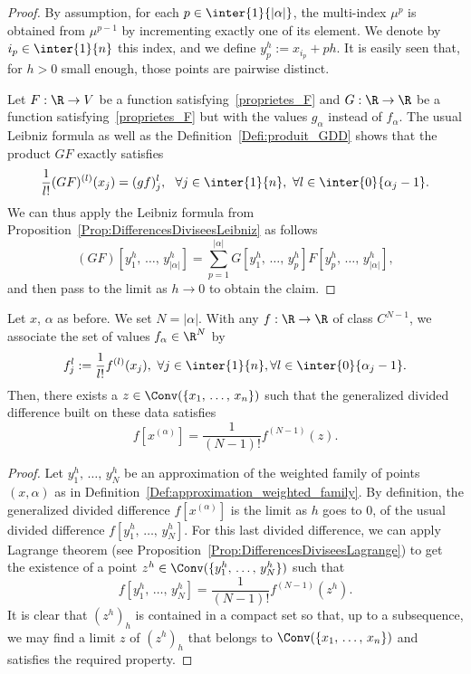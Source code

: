 \begin{proof}
By assumption, for each $p\in \inter{1}{|\alpha|}$, the multi-index $\mu^{p}$ is obtained from $\mu^{p-1}$ by incrementing exactly one of its element. We denote by $i_p\in \inter{1}{n}$ this index, and we define $y_p^h:=x_{i_p}+ph$. It is easily seen that, for $h>0$ small enough, those points are pairwise distinct.

Let $F:\R\to V$ be a function satisfying~\eqref{proprietes_F} and $G:\R\to \R$ be a function satisfying~\eqref{proprietes_F} but with the values $g_{\alpha}$ instead of $f_{\alpha}$. The usual Leibniz formula as well as the Definition~\ref{Defi:produit_GDD} shows that the product $GF$ exactly satisfies
\[
\frac{1}{l!}(GF)^{(l)}(x_j) = (gf)_j^l, \ \ \forall j\in \inter{1}{n},\ \forall l\in \inter{0}{\alpha_j-1}.
\]
We can thus apply the Leibniz formula from Proposition~\ref{Prop:DifferencesDiviseesLeibniz} as follows
\[
(GF)\left[y_1^h,\,\dotsc,\,y_{|\alpha|}^h\right] = \sum_{p=1}^{|\alpha|} G\left[y_1^h,\,\dotsc,\,y_{p}^h\right] F\left[y_p^h,\,\dotsc,\,y_{|\alpha|}^h\right],
\]
and then pass to the limit as $h\to 0$ to obtain the claim.
\end{proof}
\pagebreak

\begin{prop}
Let $x$, $\alpha$ as before. We set $N=|\alpha|$. With any $f:\R\to \R$ of class $C^{N-1}$, we associate the set of values $f_\alpha\in \R^{N}$ by
\[
f_j^l:=\frac{1}{l!} f^{(l)}(x_j), \ \forall j\in \inter{1}{n}, \forall l\in \inter{0}{\alpha_j-1}.
\]
Then, there exists a $z\in \Conv(\{x_1,\,\dotsc,\,x_n\})$ such that the generalized divided difference built on these data satisfies
\[
f\left[x^{(\alpha)}\right] = \frac{1}{(N-1)!} f^{(N-1)}(z).
\]
\end{prop}

\begin{proof}
Let $y_1^h,\,\dotsc,\,y_N^h$ be an approximation of the weighted family of points $(x,\alpha)$ as in Definition~\ref{Def:approximation_weighted_family}. By definition, the generalized divided difference $f[x^{(\alpha)}]$ is the limit as $h$ goes to $0$, of the usual divided difference $f[y_1^h,\,\dotsc,\,y_N^h]$. For this last divided difference, we can apply Lagrange theorem (see Proposition~\ref{Prop:DifferencesDiviseesLagrange}) to get the existence of a point $z^h\in \Conv (\{y_1^h,\,\dotsc,\,y_N^h\})$ such that
\[
f\left[y_1^h,\,\dotsc,\,y_N^h\right]=\frac{1}{(N-1)!} f^{(N-1)}(z^h).
\]
It is clear that $(z^h)_h$ is contained in a compact set so that, up to a subsequence, we may find a limit $z$ of $(z^h)_h$ that belongs to $\Conv(\{x_1,\,\dotsc,\,x_n\})$ and satisfies the required property.
\end{proof}

